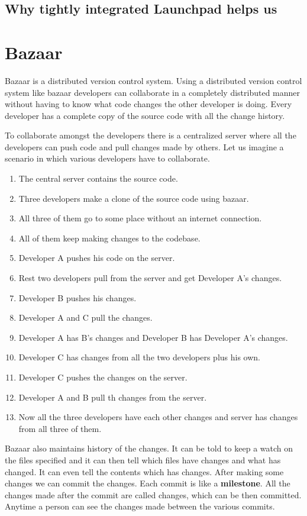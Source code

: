 \subsection{Why tightly integrated Launchpad helps us}

\section{Bazaar}
Bazaar is a distributed version control system. Using a distributed version control 
system like bazaar developers can collaborate in a completely distributed manner 
without having to know what code changes the other developer is doing. Every developer 
has a complete copy of the source code with all the change history.

To collaborate amongst the developers there is a centralized server where all the 
developers can push code and pull changes made by others. Let us imagine a scenario 
in which various developers have to collaborate.
\begin{enumerate}
\item The central server contains the source code.
\item Three developers make a clone of the source code using bazaar.
\item All three of them go to some place without an internet connection.
\item All of them keep making changes to the codebase.
\item Developer A pushes his code on the server.
\item Rest two developers pull from the server and get Developer A's changes.
\item Developer B pushes his changes.
\item Developer A and C pull the changes.
\item Developer A has B's changes and Developer B has Developer A's changes.
\item Developer C has changes from all the two developers plus his own.
\item Developer C pushes the changes on the server.
\item Developer A and B pull th changes from the server.
\item Now all the three developers have each other changes and server has changes 
from all three of them.
\end{enumerate}

Bazaar also maintains history of the changes. It can be told to keep a watch on the 
files specified and it can then tell which files have changes and what has changed. It 
can even tell the contents which has changes. After making some changes we can commit the 
changes. Each commit is like a \textbf{milestone}. All the changes made after the commit are 
called changes, which can be then committed. Anytime a person can see the changes 
made between the various commits. 

